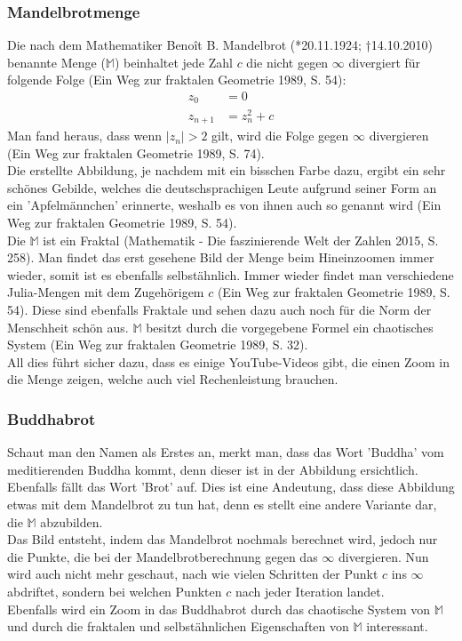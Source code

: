 \subsubsection{Mandelbrotmenge}
Die nach dem Mathematiker Benoît B. Mandelbrot (*20.11.1924; †14.10.2010) benannte Menge ($\mathbb{M}$) beinhaltet jede Zahl $c$ die nicht gegen $\infty$ divergiert für folgende Folge (Ein Weg zur fraktalen Geometrie 1989, S. 54):
\begin{align*}
z_0&=0\\
z_{n+1}&=z^2_n+c
\end{align*}
Man fand heraus, dass wenn $|z_n| > 2$ gilt, wird die Folge gegen $\infty$ divergieren (Ein Weg zur fraktalen Geometrie 1989, S. 74).\\
Die erstellte Abbildung, je nachdem mit ein bisschen Farbe dazu, ergibt ein sehr schönes Gebilde, welches die deutschsprachigen Leute aufgrund seiner Form an ein 'Apfelmännchen' erinnerte, weshalb es von ihnen auch so genannt wird (Ein Weg zur fraktalen Geometrie 1989, S. 54).\\
Die $\mathbb{M}$ ist ein Fraktal (Mathematik - Die faszinierende Welt der Zahlen 2015, S. 258). Man findet das erst gesehene Bild der Menge beim Hineinzoomen immer wieder, somit ist es ebenfalls selbstähnlich. Immer wieder findet man verschiedene Julia-Mengen mit dem Zugehörigem $c$ (Ein Weg zur fraktalen Geometrie 1989, S. 54). Diese sind ebenfalls Fraktale und sehen dazu auch noch für die Norm der Menschheit schön aus. $\mathbb{M}$ besitzt durch die vorgegebene Formel ein chaotisches System (Ein Weg zur fraktalen Geometrie 1989, S. 32).\\
All dies führt sicher dazu, dass es einige YouTube-Videos gibt, die einen Zoom in die Menge zeigen, welche auch viel Rechenleistung brauchen.

\subsubsection{Buddhabrot}
Schaut man den Namen als Erstes an, merkt man, dass das Wort 'Buddha' vom meditierenden Buddha kommt, denn dieser ist in der Abbildung ersichtlich. Ebenfalls fällt das Wort 'Brot' auf. Dies ist eine Andeutung, dass diese Abbildung etwas mit dem Mandelbrot zu tun hat, denn es stellt eine andere Variante dar, die $\mathbb{M}$ abzubilden.\\ 
Das Bild entsteht, indem das Mandelbrot nochmals berechnet wird, jedoch nur die Punkte, die bei der Mandelbrotberechnung gegen das $\infty$ divergieren. Nun wird auch nicht mehr geschaut, nach wie vielen Schritten der Punkt $c$ ins $\infty$ abdriftet, sondern bei welchen Punkten $c$ nach jeder Iteration landet.\\
Ebenfalls wird ein Zoom in das Buddhabrot durch das chaotische System von $\mathbb{M}$ und durch die fraktalen und selbstähnlichen Eigenschaften von $\mathbb{M}$ interessant.